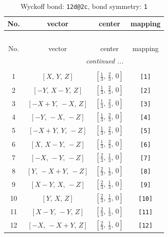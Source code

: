 \documentclass[fleqn,8pt]{jsarticle}
\begin{document}
\begin{longtable}{cccc}
\caption{Wyckoff bond: {\tt 12d@2c}, bond symmetry: {\tt 1}}
 \\
 \hline \hline
No. & vector & center & mapping \\ \hline \endfirsthead

\multicolumn{3}{l}{\tablename\ \thetable{}} \\
 \hline \hline
No. & vector & center & mapping \\ \hline \endhead

 \hline \hline
\multicolumn{3}{r}{\footnotesize\it continued ...} \\ \endfoot

 \hline \hline
\multicolumn{3}{r}{} \\ \endlastfoot

1 & $\left[ X,\, Y,\, Z \right]$ & $\left[ \frac{1}{3},\, \frac{2}{3},\, 0 \right]$ & {\tt [1]} \\ \hline
2 & $\left[ - Y,\, X - Y,\, Z \right]$ & $\left[ \frac{1}{3},\, \frac{2}{3},\, 0 \right]$ & {\tt [2]} \\ \hline
3 & $\left[ - X + Y,\, - X,\, Z \right]$ & $\left[ \frac{1}{3},\, \frac{2}{3},\, 0 \right]$ & {\tt [3]} \\ \hline
4 & $\left[ - Y,\, - X,\, - Z \right]$ & $\left[ \frac{1}{3},\, \frac{2}{3},\, 0 \right]$ & {\tt [4]} \\ \hline
5 & $\left[ - X + Y,\, Y,\, - Z \right]$ & $\left[ \frac{1}{3},\, \frac{2}{3},\, 0 \right]$ & {\tt [5]} \\ \hline
6 & $\left[ X,\, X - Y,\, - Z \right]$ & $\left[ \frac{1}{3},\, \frac{2}{3},\, 0 \right]$ & {\tt [6]} \\ \hline
7 & $\left[ - X,\, - Y,\, - Z \right]$ & $\left[ \frac{2}{3},\, \frac{1}{3},\, 0 \right]$ & {\tt [7]} \\ \hline
8 & $\left[ Y,\, - X + Y,\, - Z \right]$ & $\left[ \frac{2}{3},\, \frac{1}{3},\, 0 \right]$ & {\tt [8]} \\ \hline
9 & $\left[ X - Y,\, X,\, - Z \right]$ & $\left[ \frac{2}{3},\, \frac{1}{3},\, 0 \right]$ & {\tt [9]} \\ \hline
10 & $\left[ Y,\, X,\, Z \right]$ & $\left[ \frac{2}{3},\, \frac{1}{3},\, 0 \right]$ & {\tt [10]} \\ \hline
11 & $\left[ X - Y,\, - Y,\, Z \right]$ & $\left[ \frac{2}{3},\, \frac{1}{3},\, 0 \right]$ & {\tt [11]} \\ \hline
12 & $\left[ - X,\, - X + Y,\, Z \right]$ & $\left[ \frac{2}{3},\, \frac{1}{3},\, 0 \right]$ & {\tt [12]} \\
\end{longtable}
\end{document}
